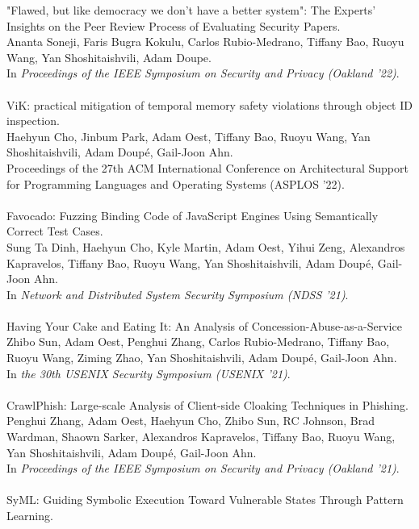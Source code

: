 \documentclass[11pt]{article}
\begin{document}
"Flawed, but like democracy we don't have a better system": The Experts' Insights on the Peer Review Process of Evaluating Security Papers. \\
Ananta Soneji, Faris Bugra Kokulu, Carlos Rubio-Medrano, Tiffany Bao, Ruoyu Wang, Yan Shoshitaishvili, Adam Doupe.\\
In \emph{Proceedings of the IEEE Symposium on Security and Privacy (Oakland '22)}.
\\\\
ViK: practical mitigation of temporal memory safety violations through object ID inspection. \\
Haehyun Cho, Jinbum Park, Adam Oest, Tiffany Bao, Ruoyu Wang, Yan Shoshitaishvili, Adam Doupé, Gail-Joon Ahn. \\
Proceedings of the 27th ACM International Conference on Architectural Support for Programming Languages and Operating Systems (ASPLOS '22).
\\\\
Favocado: Fuzzing Binding Code of JavaScript Engines Using Semantically Correct Test Cases. \\
Sung Ta Dinh, Haehyun Cho, Kyle Martin, Adam Oest, Yihui Zeng, Alexandros Kapravelos, Tiffany Bao, Ruoyu Wang, Yan Shoshitaishvili, Adam Doupé, Gail-Joon Ahn. \\
In \emph{Network and Distributed System Security Symposium (NDSS '21)}.
\\\\
Having Your Cake and Eating It: An Analysis of Concession-Abuse-as-a-Service \\
Zhibo Sun, Adam Oest, Penghui Zhang, Carlos Rubio-Medrano, Tiffany Bao, Ruoyu Wang, Ziming Zhao, Yan Shoshitaishvili, Adam Doupé, Gail-Joon Ahn. \\
In \emph{the 30th USENIX Security Symposium (USENIX '21)}.
\\\\
CrawlPhish: Large-scale Analysis of Client-side Cloaking Techniques in Phishing. \\
Penghui Zhang, Adam Oest, Haehyun Cho, Zhibo Sun, RC Johnson, Brad Wardman, Shaown Sarker, Alexandros Kapravelos, 
Tiffany Bao, Ruoyu Wang, Yan Shoshitaishvili, Adam Doupé, Gail-Joon Ahn. \\
In \emph{Proceedings of the IEEE Symposium on Security and Privacy (Oakland '21)}.
\\\\
SyML: Guiding Symbolic Execution Toward Vulnerable States Through Pattern Learning. \\
\end{document}
